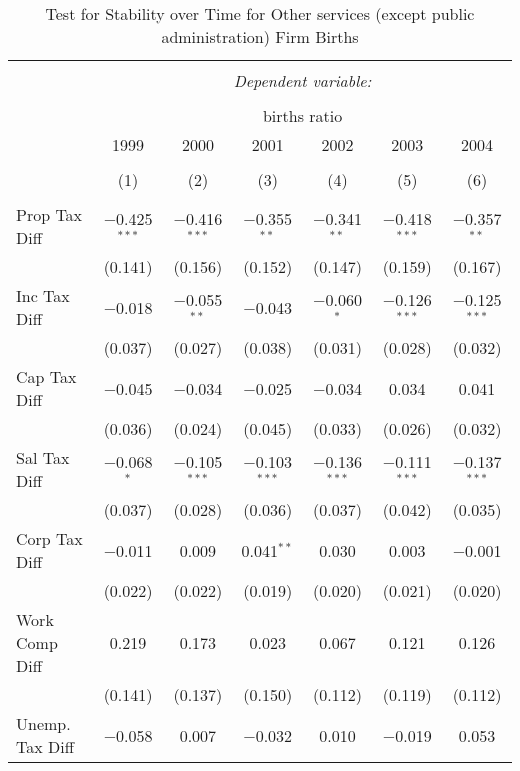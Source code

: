 
\begin{table}[!htbp] \centering 
  \caption{Test for Stability over Time for  Other services (except public administration) Firm Births} 
  \label{81year} 
\small 
\begin{tabular}{@{\extracolsep{5pt}}lcccccc} 
\\[-1.8ex]\hline 
\hline \\[-1.8ex] 
 & \multicolumn{6}{c}{\textit{Dependent variable:}} \\ 
\cline{2-7} 
\\[-1.8ex] & \multicolumn{6}{c}{births ratio} \\ 
 & 1999 & 2000 & 2001 & 2002 & 2003 & 2004 \\ 
\\[-1.8ex] & (1) & (2) & (3) & (4) & (5) & (6)\\ 
\hline \\[-1.8ex] 
 Prop Tax Diff & $-$0.425$^{***}$ & $-$0.416$^{***}$ & $-$0.355$^{**}$ & $-$0.341$^{**}$ & $-$0.418$^{***}$ & $-$0.357$^{**}$ \\ 
  & (0.141) & (0.156) & (0.152) & (0.147) & (0.159) & (0.167) \\ 
  Inc Tax Diff & $-$0.018 & $-$0.055$^{**}$ & $-$0.043 & $-$0.060$^{*}$ & $-$0.126$^{***}$ & $-$0.125$^{***}$ \\ 
  & (0.037) & (0.027) & (0.038) & (0.031) & (0.028) & (0.032) \\ 
  Cap Tax Diff & $-$0.045 & $-$0.034 & $-$0.025 & $-$0.034 & 0.034 & 0.041 \\ 
  & (0.036) & (0.024) & (0.045) & (0.033) & (0.026) & (0.032) \\ 
  Sal Tax Diff & $-$0.068$^{*}$ & $-$0.105$^{***}$ & $-$0.103$^{***}$ & $-$0.136$^{***}$ & $-$0.111$^{***}$ & $-$0.137$^{***}$ \\ 
  & (0.037) & (0.028) & (0.036) & (0.037) & (0.042) & (0.035) \\ 
  Corp Tax Diff & $-$0.011 & 0.009 & 0.041$^{**}$ & 0.030 & 0.003 & $-$0.001 \\ 
  & (0.022) & (0.022) & (0.019) & (0.020) & (0.021) & (0.020) \\ 
  Work Comp Diff & 0.219 & 0.173 & 0.023 & 0.067 & 0.121 & 0.126 \\ 
  & (0.141) & (0.137) & (0.150) & (0.112) & (0.119) & (0.112) \\ 
  Unemp. Tax Diff & $-$0.058 & 0.007 & $-$0.032 & 0.010 & $-$0.019 & 0.053 \\ 

\end{tabular}
\end{table}
